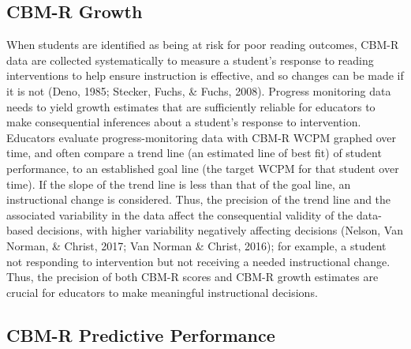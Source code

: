 \documentclass[
  english,
  man, fleqn, noextraspace]{apa6}
\begin{document}
\hypertarget{cbm-r-growth}{%
\subsection{CBM-R Growth}\label{cbm-r-growth}}

When students are identified as being at risk for poor reading outcomes, CBM-R data are collected systematically to measure a student's response to reading interventions to help ensure instruction is effective, and so changes can be made if it is not (Deno, 1985; Stecker, Fuchs, \& Fuchs, 2008). Progress monitoring data needs to yield growth estimates that are sufficiently reliable for educators to make consequential inferences about a student's response to intervention. Educators evaluate progress-monitoring data with CBM-R WCPM graphed over time, and often compare a trend line (an estimated line of best fit) of student performance, to an established goal line (the target WCPM for that student over time). If the slope of the trend line is less than that of the goal line, an instructional change is considered. Thus, the precision of the trend line and the associated variability in the data affect the consequential validity of the data-based decisions, with higher variability negatively affecting decisions (Nelson, Van Norman, \& Christ, 2017; Van Norman \& Christ, 2016); for example, a student not responding to intervention but not receiving a needed instructional change. Thus, the precision of both CBM-R scores and CBM-R growth estimates are crucial for educators to make meaningful instructional decisions.

\hypertarget{cbm-r-predictive-performance}{%
\subsection{CBM-R Predictive Performance}\label{cbm-r-predictive-performance}}
\end{document}
